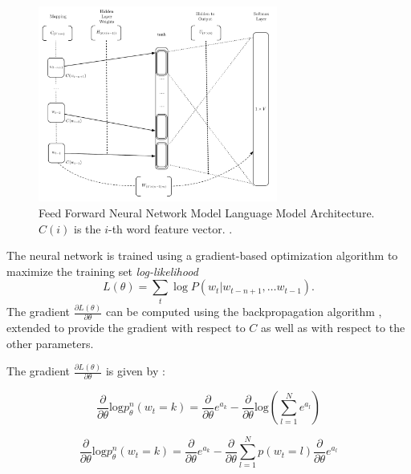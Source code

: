 \begin{figure}[h]
    \centering
    \includegraphics[width=0.7\textwidth]{images/bengio-nnlm.pdf}
    \caption{Feed Forward Neural Network Model Language Model Architecture.
       $C(i)$ is the $i$-th word feature vector.  \cite{Bengio:2003:NPL:944919.944966}.}
    \label{fig:NNLM_architecture}
\end{figure}

The neural network is trained using a gradient-based optimization algorithm
to maximize the training set \textit{log-likelihood}
\begin{equation}
 L(\theta) = \sum_t \log P(w_t | w_{t-n+1}, \ldots w_{t-1}) .
\end{equation}
The gradient $\frac{\partial L(\theta)}{\partial \theta}$
can be computed using the backpropagation algorithm \cite{Bishop:1995:NNP:525960}, extended
to provide the gradient with respect to $C$ as well as with
respect to the other parameters. 



The gradient   $\frac{\partial L(\theta)}{\partial
  \theta}$   is given by  :



\begin{equation*}
  \label{eq:nnlm-grad}
  \frac{\partial }{\partial \theta}\text{log}p_{\theta}^{n}(w_t=k) =
  \frac{\partial }{\partial \theta} e^{a_k} -  \frac{\partial }{\partial
    \theta}\text{log} \left( \sum_{l=1}^N e^{a_l} \right)
 \end{equation*}

\begin{equation}
\label{eq:dlogp-gradient}
  \frac{\partial }{\partial \theta}\text{log}p_{\theta}^{n}(w_t=k)  =  \frac{\partial }{\partial \theta} e^{a_k}  -   \frac{\partial }{\partial
    \theta}  \sum_{l=1}^N  p(w_t = l)  \frac{\partial }{\partial
    \theta}  e^{a_l}   
\end{equation}


